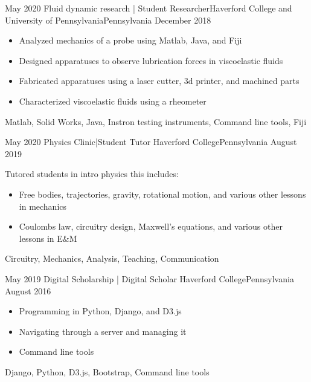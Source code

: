 \begin{experiences}
  \experience
    {May 2020}   {Fluid dynamic research | Student Researcher}{Haverford College and University of Pennsylvania}{Pennsylvania}
    {December 2018} {
                      \begin{itemize}
                        \item Analyzed mechanics of a probe using Matlab, Java, and Fiji
                        \item Designed apparatuses to observe lubrication forces in viscoelastic fluids           
                        \item Fabricated apparatuses using a laser cutter, 3d printer, and machined parts 
                        \item Characterized viscoelastic fluids using a rheometer  
                      \end{itemize}
                    }
                    {Matlab, Solid Works, Java, Instron testing instruments, Command line tools, Fiji}
  \emptySeparator
 
  \experience
  {May 2020}      {Physics Clinic|Student Tutor }{Haverford College}{Pennsylvania}
  {August 2019} {
                    Tutored students in intro physics this includes:
			\begin{itemize}
                       \item  Free bodies, trajectories, gravity, rotational motion, and  various other lessons in mechanics   
                       \item Coulombs law, circuitry design, Maxwell's equations, and  various other lessons in E\&M
 			\end{itemize} 
                 }
                {Circuitry, Mechanics, Analysis, Teaching, Communication}   
 \emptySeparator
 
 
  \experience
    {May 2019}     {Digital Scholarship | Digital Scholar }{Haverford College}{Pennsylvania}
    {August 2016}    {
                      \begin{itemize}
			    \item Programming in Python, Django, and D3.js         
                        \item Navigating through a server and managing it               
                         \item Command line tools
                      \end{itemize}
                    }
                    {Django, Python, D3.js, Bootstrap, Command line tools}
  \emptySeparator


\end{experiences}
